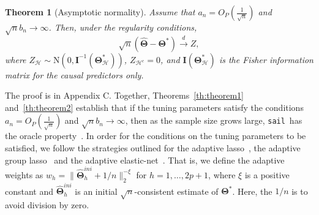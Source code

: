 \documentclass[12pt,letter]{article}\usepackage[]{graphicx}\usepackage[]{color}
\newtheorem{theorem}{Theorem}
\newtheorem{proposition}{Proposition}
\newcommand{\sail}{\texttt{sail}}
\newcommand{\bTheta}{\boldsymbol{\Theta}}
\newcommand{\btheta}{\boldsymbol{\theta}}
\begin{document}
\begin{theorem}[Asymptotic normality] \label{th:theorem2}
Assume that $a_n = O_P(\frac{1}{\sqrt{n}})$ and $\sqrt{n}b_n \to \infty$. Then, under the regularity conditions, 
\begin{equation}
\sqrt{n}\left(\widehat{\bTheta}-\bTheta^{*}\right) \stackrel{d}{\rightarrow} Z,
\end{equation}
where $Z_{\mathcal{H}} \sim \mathrm{N}\left(0, \mathbf{I}^{-1}\left(\boldsymbol{\Theta}_{\mathcal{H}}^{*}\right) \right)$, $Z_{\mathcal{H}^{c}}=0$, and $\mathbf{I}\left(\boldsymbol{\Theta}_{\mathcal{H}}^{*}\right)$ is the Fisher information matrix for the causal predictors only. 
\end{theorem}
The proof is in Appendix C. Together, Theorems~\eqref{th:theorem1} and~\eqref{th:theorem2} establish that if the tuning parameters satisfy the conditions $a_n = O_P(\frac{1}{\sqrt{n}})$ and $\sqrt{n}b_n \to \infty$, then as the sample size grows large, \sail ~has the oracle property~\citep{fan2001variable}. In order for the conditions on the tuning parameters to be satisfied, we follow the strategies outlined for the adaptive lasso~\citep{zou2006adaptive}, the adaptive group lasso~\citep{nardi2008asymptotic} and the adaptive elastic-net~\citep{zou2009adaptive}. That is, we define the adaptive weights as $w_h = \| \widehat{\bTheta}_h^{ini} + 1/n \|_2^{-\xi}$ for $h=1, \ldots, 2p+1$, where $\xi$ is a positive constant and $\widehat{\bTheta}_h^{ini}$ is an initial $\sqrt{n}$-consistent estimate of $\bTheta^*$. Here, the $1/n$ is to avoid division by zero. 



\begin{comment}
\begin{proposition}
\begin{itemize}
	\item 	proposition 3.1 of rinaldi paper says that model selection consistency property, i.e.,  
	\[\mathbb{P}\left\{\widehat{\mathcal{H}}=\mathcal{H}_{0}\right\} \rightarrow 1, \quad \text { as } n \rightarrow \infty\]
	holds only if \[\sqrt{n} \lambda \lambda_{h} \rightarrow \infty, \quad \forall h \notin \mathcal{H}_{0}\]. the issue is that you need knowledge of the true active set. So in theorem 3.2 they propose the adaptive group lasso
	\item Theorem 3.2 of rinaldi shows the model selection consistency property and asymptotic normality using adaptive group lasso weights. 
	\item Theorem 3.3 of rinaldi follows fan and li 2001 and shows existence of a local minimizer inside a ball around the truth. This is Lemma 1 of Choi and Theorem 1 of Fan and Li. It also shows that the penalty terms for the zero and non-zero blocks need to have a different asymptotic behavior. This is what Choi does in Lemma1+Theorem 1. 
\end{itemize}
\end{proposition}
\end{comment}
\end{document}
